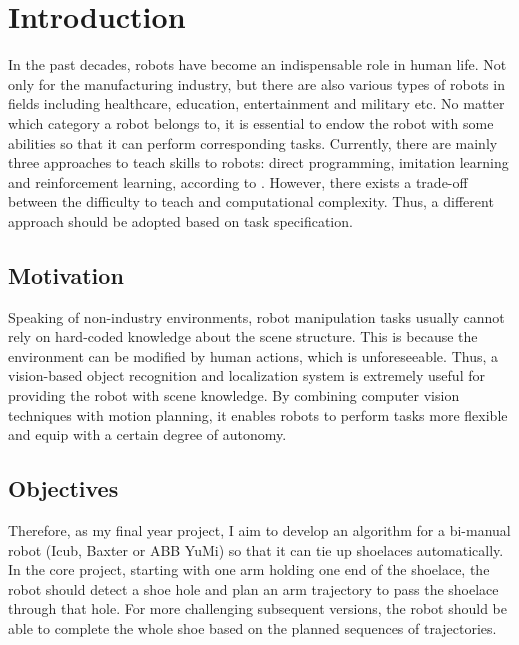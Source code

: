 \chapter{Introduction}

In the past decades, robots have become an indispensable role in human life. Not only for the manufacturing industry, but there are also various types of robots in fields including healthcare, education, entertainment and military etc. No matter which category a robot belongs to, it is essential to endow the robot with some abilities so that it can perform corresponding tasks. Currently, there are mainly three approaches to teach skills to robots: direct programming, imitation learning and reinforcement learning, according to \citep{Kormushev_MDPI_2013}. However, there exists a trade-off between the difficulty to teach and computational complexity. Thus, a different approach should be adopted based on task specification.

\section{Motivation}
Speaking of non-industry environments, robot manipulation tasks usually cannot rely on hard-coded knowledge about the scene structure. This is because the environment can be modified by human actions, which is unforeseeable. Thus, a vision-based object recognition and localization system is extremely useful for providing the robot with scene knowledge. By combining computer vision techniques with motion planning, it enables robots to perform tasks more flexible and equip with a certain degree of autonomy.

\section{Objectives}
Therefore, as my final year project, I aim to develop an algorithm for a bi-manual robot (Icub, Baxter or ABB YuMi) so that it can tie up shoelaces automatically. In the core project, starting with one arm holding one end of the shoelace, the robot should detect a shoe hole and plan an arm trajectory to pass the shoelace through that hole. For more challenging subsequent versions, the robot should be able to complete the whole shoe based on the planned sequences of trajectories. 

